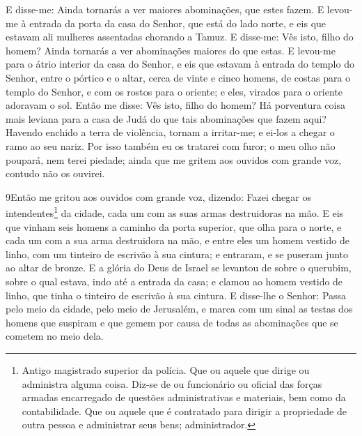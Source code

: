 E disse-me: Ainda tornarás a ver maiores abominações, que estes
fazem. E levou-me à entrada da porta da casa do Senhor, que
está do lado norte, e eis que estavam ali mulheres assentadas
chorando a Tamuz. E disse-me: Vês isto, filho do homem? Ainda
tornarás a ver abominações maiores do que estas. E levou-me
para o átrio interior da casa do Senhor, e eis que estavam à entrada
do templo do Senhor, entre o pórtico e o altar, cerca de vinte e
cinco homens, de costas para o templo do Senhor, e com os rostos
para o oriente; e eles, virados para o oriente adoravam o sol.
Então me disse: Vês isto, filho do homem? Há porventura coisa
mais leviana para a casa de Judá do que tais abominações que fazem
aqui? Havendo enchido a terra de violência, tornam a irritar-me; e
ei-los a chegar o ramo ao seu nariz. Por isso também eu os
tratarei com furor; o meu olho não poupará, nem terei piedade; ainda
que me gritem aos ouvidos com grande voz, contudo não os ouvirei.

\medskip

\lettrine{9} Então me gritou aos ouvidos com grande voz,
dizendo: Fazei chegar os intendentes\footnote{Antigo magistrado
superior da polícia. Que ou aquele que dirige ou administra alguma
coisa. Diz-se de ou funcionário ou oficial das forças armadas
encarregado de questões administrativas e materiais, bem como da
contabilidade. Que ou aquele que é contratado para dirigir a
propriedade de outra pessoa e administrar seus bens; administrador.}
da cidade, cada um com as suas armas destruidoras na mão. E eis
que vinham seis homens a caminho da porta superior, que olha para o
norte, e cada um com a sua arma destruidora na mão, e entre eles um
homem vestido de linho, com um tinteiro de escrivão à sua cintura; e
entraram, e se puseram junto ao altar de bronze. E a glória do
Deus de Israel se levantou de sobre o querubim, sobre o qual estava,
indo até a entrada da casa; e clamou ao homem vestido de linho, que
tinha o tinteiro de escrivão à sua cintura. E disse-lhe o
Senhor: Passa pelo meio da cidade, pelo meio de Jerusalém, e marca
com um sinal as testas dos homens que suspiram e que gemem por causa
de todas as abominações que se cometem no meio dela.

